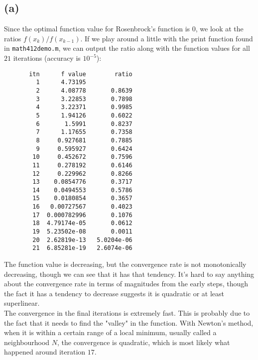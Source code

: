 \documentclass[a4paper, fleqn]{article}
\begin{document}
\subsection{(a)}
Since the optimal function value for Rosenbrock's function is $0$, we look at the ratios $f(x_k)/f(x_{k-1})$. If we play around a little with the print function found in \texttt{math412demo.m}, we can output the ratio along with the function values for all $21$ iterations (accuracy is $10^{-5}$):
\begin{verbatim}
       itn      f value        ratio
         1      4.73195
         2      4.08778       0.8639
         3      3.22853       0.7898
         4      3.22371       0.9985
         5      1.94126       0.6022
         6       1.5991       0.8237
         7      1.17655       0.7358
         8     0.927681       0.7885
         9     0.595927       0.6424
        10     0.452672       0.7596
        11     0.278192       0.6146
        12     0.229962       0.8266
        13    0.0854776       0.3717
        14    0.0494553       0.5786
        15    0.0180854       0.3657
        16   0.00727567       0.4023
        17  0.000782996       0.1076
        18  4.79174e-05       0.0612
        19  5.23502e-08       0.0011
        20  2.62819e-13   5.0204e-06
        21  6.85281e-19   2.6074e-06
\end{verbatim}
The function value is decreasing, but the convergence rate is not monotonically decreasing, though we can see that it has that tendency. It's hard to say anything about the convergence rate in terms of magnitudes from the early steps, though the fact it has a tendency to decrease suggests it is quadratic or at least superlinear. \\
The convergence in the final iterations is extremely fast. This is probably due to the fact that it needs to find the "valley" in the function. With Newton's method, when it is within a certain range of a local minimum, usually called a neighbourhood $N$, the convergence is quadratic, which is most likely what happened around iteration $17$.
\end{document}
